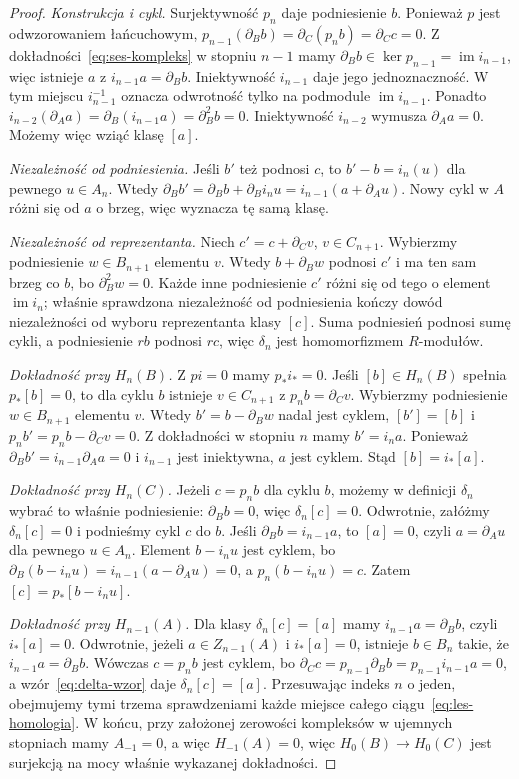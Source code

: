 \begin{proof}
\emph{Konstrukcja i cykl.} Surjektywność $p_n$
daje podniesienie $b$. Ponieważ $p$ jest odwzorowaniem
łańcuchowym, $p_{n-1}(\partial_Bb)=\partial_C(p_nb)
=\partial_Cc=0$.
Z dokładności~\eqref{eq:ses-kompleks} w
stopniu $n-1$ mamy
$\partial_Bb\in\ker p_{n-1}=\operatorname{im}i_{n-1}$,
więc istnieje $a$ z $i_{n-1}a=\partial_Bb$.
Iniektywność $i_{n-1}$ daje jego jednoznaczność.
W tym miejscu $i_{n-1}^{-1}$ oznacza odwrotność
tylko na podmodule $\operatorname{im}i_{n-1}$.
Ponadto $i_{n-2}(\partial_Aa)
=\partial_B(i_{n-1}a)=\partial_B^2b=0$.
Iniektywność $i_{n-2}$ wymusza $\partial_Aa=0$.
Możemy więc wziąć klasę $[a]$.

\emph{Niezależność od podniesienia.} Jeśli $b'$ też
podnosi $c$, to $b'-b=i_n(u)$ dla pewnego
$u\in A_n$. Wtedy $\partial_Bb'=\partial_Bb
+\partial_Bi_nu=i_{n-1}(a+\partial_Au)$.
Nowy cykl w $A$ różni się od $a$ o brzeg,
więc wyznacza tę samą klasę.

\emph{Niezależność od reprezentanta.}
Niech $c'=c+\partial_Cv$, $v\in C_{n+1}$.
Wybierzmy podniesienie $w\in B_{n+1}$ elementu $v$.
Wtedy $b+\partial_Bw$ podnosi $c'$ i ma ten sam
brzeg co $b$, bo $\partial_B^2w=0$.
Każde inne podniesienie $c'$ różni się od tego
o element $\operatorname{im}i_n$; właśnie
sprawdzona niezależność od podniesienia
kończy dowód niezależności od wyboru reprezentanta klasy $[c]$.
Suma podniesień podnosi sumę cykli, a
podniesienie $rb$ podnosi $rc$, więc $\delta_n$
jest homomorfizmem $R$-modułów.

\emph{Dokładność przy $H_n(B)$.}
Z $pi=0$ mamy $p_*i_*=0$.
Jeśli $[b]\in H_n(B)$ spełnia
$p_*[b]=0$, to dla cyklu $b$
istnieje $v\in C_{n+1}$ z
$p_nb=\partial_Cv$. Wybierzmy podniesienie
$w\in B_{n+1}$ elementu $v$.
Wtedy $b'=b-\partial_Bw$ nadal jest cyklem,
$[b']=[b]$ i
$p_nb'=p_nb-\partial_Cv=0$. Z dokładności
w stopniu $n$ mamy $b'=i_na$.
Ponieważ $\partial_Bb'=i_{n-1}\partial_Aa=0$
i $i_{n-1}$ jest iniektywna, $a$ jest
cyklem. Stąd $[b]=i_*[a]$.

\emph{Dokładność przy $H_n(C)$.}
Jeżeli $c=p_nb$ dla cyklu $b$, możemy
w definicji $\delta_n$ wybrać to właśnie
podniesienie: $\partial_Bb=0$, więc $\delta_n[c]=0$.
Odwrotnie, załóżmy $\delta_n[c]=0$
i podnieśmy cykl $c$ do $b$.
Jeśli $\partial_Bb=i_{n-1}a$, to $[a]=0$,
czyli $a=\partial_Au$ dla pewnego $u\in A_n$.
Element $b-i_nu$ jest cyklem, bo
$\partial_B(b-i_nu)=i_{n-1}(a-\partial_Au)=0$,
a $p_n(b-i_nu)=c$. Zatem
$[c]=p_*[b-i_nu]$.

\emph{Dokładność przy $H_{n-1}(A)$.}
Dla klasy $\delta_n[c]=[a]$ mamy
$i_{n-1}a=\partial_Bb$, czyli $i_*[a]=0$.
Odwrotnie, jeżeli $a\in Z_{n-1}(A)$
i $i_*[a]=0$, istnieje $b\in B_n$
takie, że $i_{n-1}a=\partial_Bb$.
Wówczas $c=p_nb$ jest cyklem, bo
$\partial_Cc=p_{n-1}\partial_Bb=p_{n-1}i_{n-1}a=0$,
a wzór~\eqref{eq:delta-wzor} daje
$\delta_n[c]=[a]$.
Przesuwając indeks $n$ o jeden,
obejmujemy tymi trzema sprawdzeniami
każde miejsce całego ciągu~\eqref{eq:les-homologia}.
W końcu, przy założonej zerowości kompleksów w ujemnych
stopniach mamy $A_{-1}=0$, a więc
$H_{-1}(A)=0$, więc $H_0(B)\to H_0(C)$
jest surjekcją na mocy właśnie wykazanej
dokładności.
\end{proof}

